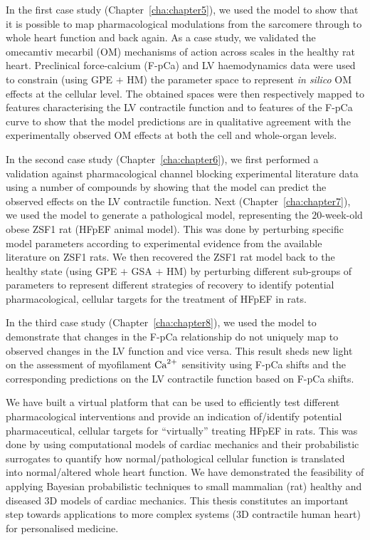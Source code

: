 \newpage
In the first case study (Chapter~\ref{cha:chapter5}), we used the model to show that it is possible to map pharmacological modulations from the sarcomere through to whole heart function and back again. As a case study, we validated the omecamtiv mecarbil (OM) mechanisms of action across scales in the healthy rat heart. Preclinical force-calcium (F-pCa) and LV haemodynamics data were used to constrain (using GPE $+$ HM) the parameter space to represent \textit{in silico} OM effects at the cellular level. The obtained spaces were then respectively mapped to features characterising the LV contractile function and to features of the F-pCa curve to show that the model predictions are in qualitative agreement with the experimentally observed OM effects at both the cell and whole-organ levels.

\vspace{0.2cm}
In the second case study (Chapter~\ref{cha:chapter6}), we first performed a validation against pharmacological channel blocking experimental literature data using a number of compounds by showing that the model can predict the observed effects on the LV contractile function. Next (Chapter~\ref{cha:chapter7}), we used the model to generate a pathological model, representing the $20$-week-old obese ZSF1 rat (HFpEF animal model). This was done by perturbing specific model parameters according to experimental evidence from the available literature on ZSF1 rats. We then recovered the ZSF1 rat model back to the healthy state (using GPE $+$ GSA $+$ HM) by perturbing different sub-groups of parameters to represent different strategies of recovery to identify potential pharmacological, cellular targets for the treatment of HFpEF in rats.

\vspace{0.2cm}
In the third case study (Chapter~\ref{cha:chapter8}), we used the model to demonstrate that changes in the F-pCa relationship do not uniquely map to observed changes in the LV function and vice versa. This result sheds new light on the assessment of myofilament $\textrm{Ca}^{2+}$ sensitivity using F-pCa shifts and the corresponding predictions on the LV contractile function based on F-pCa shifts.

\vspace{0.2cm}
We have built a virtual platform that can be used to efficiently test different pharmacological interventions and provide an indication of/identify potential pharmaceutical, cellular targets for ``virtually'' treating HFpEF in rats. This was done by using computational models of cardiac mechanics and their probabilistic surrogates to quantify how normal/pathological cellular function is translated into normal/altered whole heart function. We have demonstrated the feasibility of applying Bayesian probabilistic techniques to small mammalian (rat) healthy and diseased $3$D models of cardiac mechanics. This thesis constitutes an important step towards applications to more complex systems ($3$D contractile human heart) for personalised medicine.

